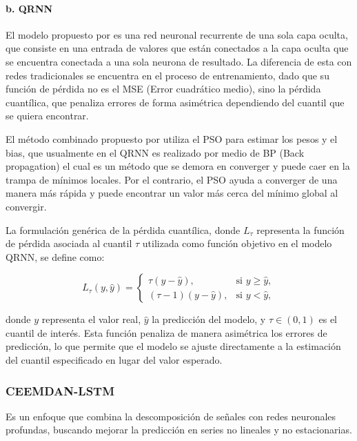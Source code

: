 \documentclass[12pt]{paper}
\begin{document}
\paragraph{b. QRNN}
El modelo propuesto por \cite{taylor2000qrnn} es una red neuronal recurrente de una sola capa oculta, que consiste en una entrada de valores que están conectados a la capa oculta que se encuentra conectada a una sola neurona de resultado. La diferencia de esta con redes tradicionales se encuentra en el proceso de entrenamiento, dado que su función de pérdida no es el MSE (Error cuadrático medio), sino la pérdida cuantílica, que penaliza errores de forma asimétrica dependiendo del cuantil que se quiera encontrar.

El método combinado propuesto por \cite{pradeepkumar2017forecasting} utiliza el PSO para estimar los pesos y el bias, que usualmente en el QRNN es realizado por medio de BP (Back propagation) el cual es un método que se demora en converger y puede caer en la trampa de mínimos locales. Por el contrario, el PSO ayuda a converger de una manera más rápida y puede encontrar un valor más cerca del mínimo global al convergir.

La formulación genérica de la pérdida cuantílica, donde $L_{\tau}$ representa la función de pérdida asociada al cuantil $\tau$ utilizada como función objetivo en el modelo QRNN, se define como:

\begin{equation}
L_{\tau}(y, \hat{y}) =
\begin{cases}
\tau (y - \hat{y}), & \text{si } y \geq \hat{y}, \\
(\tau - 1)(y - \hat{y}), & \text{si } y < \hat{y},
\end{cases}
\end{equation}

donde $y$ representa el valor real, $\hat{y}$ la predicción del modelo, y $\tau \in (0,1)$ es el cuantil de interés. Esta función penaliza de manera asimétrica los errores de predicción, lo que permite que el modelo se ajuste directamente a la estimación del cuantil especificado en lugar del valor esperado.

\subsubsection[CEEMDAN-LSTM]{CEEMDAN-LSTM}

Es un enfoque que combina la descomposición de señales con redes neuronales profundas, buscando mejorar la predicción en series no lineales y no estacionarias.
\end{document}
